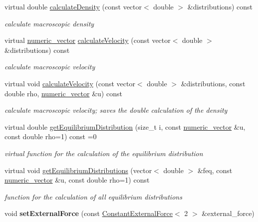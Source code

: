 \begin{DoxyCompactItemize}
\item 
virtual double \hyperlink{classnatrium_1_1CollisionModel_ae1c879c87ac210a227a8e3da2d0ac385}{calculateDensity} (const vector$<$ double $>$ \&distributions) const 
\begin{DoxyCompactList}\small\item\em calculate macroscopic density \item\end{DoxyCompactList}\item 
virtual \hyperlink{namespacenatrium_a67c39077adc6634f8fa3762b8eef24c4}{numeric\_\-vector} \hyperlink{classnatrium_1_1CollisionModel_a90428f4c29916641de3de872803dde0f}{calculateVelocity} (const vector$<$ double $>$ \&distributions) const 
\begin{DoxyCompactList}\small\item\em calculate macroscopic velocity \item\end{DoxyCompactList}\item 
virtual void \hyperlink{classnatrium_1_1CollisionModel_a667f0e36da1bfb1c5102adb8f3afdcde}{calculateVelocity} (const vector$<$ double $>$ \&distributions, const double rho, \hyperlink{namespacenatrium_a67c39077adc6634f8fa3762b8eef24c4}{numeric\_\-vector} \&u) const 
\begin{DoxyCompactList}\small\item\em calculate macroscopic velocity; saves the double calculation of the density \item\end{DoxyCompactList}\item 
virtual double \hyperlink{classnatrium_1_1CollisionModel_a88b382d63da80e950bc58e8afad769a6}{getEquilibriumDistribution} (size\_\-t i, const \hyperlink{namespacenatrium_a67c39077adc6634f8fa3762b8eef24c4}{numeric\_\-vector} \&u, const double rho=1) const =0
\begin{DoxyCompactList}\small\item\em virtual function for the calculation of the equilibrium distribution \item\end{DoxyCompactList}\item 
virtual void \hyperlink{classnatrium_1_1CollisionModel_a296474961c4501bc23228be1d30ebf82}{getEquilibriumDistributions} (vector$<$ double $>$ \&feq, const \hyperlink{namespacenatrium_a67c39077adc6634f8fa3762b8eef24c4}{numeric\_\-vector} \&u, const double rho=1) const 
\begin{DoxyCompactList}\small\item\em function for the calculation of all equilibrium distributions \item\end{DoxyCompactList}\item 
\hypertarget{classnatrium_1_1CollisionModel_a44bababd58cae1fea650fe2bd86555b5}{
void {\bfseries setExternalForce} (const \hyperlink{classnatrium_1_1ConstantExternalForce}{ConstantExternalForce}$<$ 2 $>$ \&external\_\-force)}
\label{classnatrium_1_1CollisionModel_a44bababd58cae1fea650fe2bd86555b5}


\end{DoxyCompactItemize}
